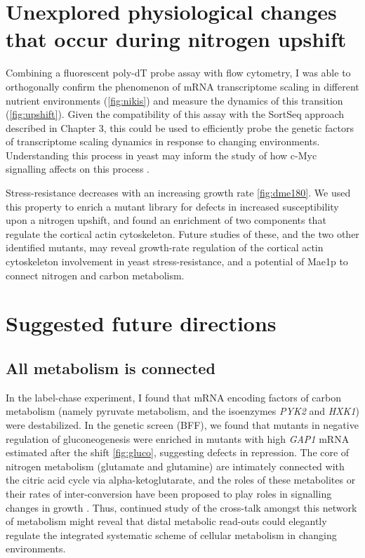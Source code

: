 \section{Unexplored physiological changes that occur during nitrogen
upshift}

Combining a fluorescent poly-dT probe assay
\parencite{amberg1992isolation} with flow cytometry, I was able to
orthogonally confirm the phenomenon of mRNA transcriptome scaling
in different nutrient environments (\autoref{fig:nikis}) and 
measure the dynamics of this transition (\autoref{fig:upshift}).
Given the compatibility of this assay with the SortSeq approach
described in Chapter 3, this could be used to efficiently probe the 
genetic factors of transcriptome scaling dynamics in response to
changing environments. Understanding this process in yeast may
inform the study of how c-Myc signalling affects on this process
\parencite{nie2012c}.

Stress-resistance decreases with an increasing growth rate
\autoref{fig:dme180}.
We used this property to enrich a mutant library for defects in
increased susceptibility upon a nitrogen upshift, and found an
enrichment of two components that regulate the cortical actin 
cytoskeleton. Future studies of these, and the two other identified
mutants, may reveal growth-rate regulation of the cortical actin 
cytoskeleton involvement in yeast stress-resistance, and a potential
of Mae1p to connect nitrogen and carbon metabolism.

\section{Suggested future directions}

\subsection{All metabolism is connected}

In the label-chase experiment, I found that mRNA encoding factors of
carbon metabolism (namely pyruvate metabolism, and the isoenzymes 
\textit{PYK2} and \textit{HXK1}) were destabilized.
In the genetic screen (BFF), we found that mutants in negative
regulation of gluconeogenesis were enriched in mutants with high
\textit{GAP1} mRNA estimated after the shift
\autoref{fig:gluco}, suggesting defects 
in repression. The core of nitrogen metabolism (glutamate and
glutamine) are intimately connected with the citric acid cycle via
alpha-ketoglutarate, and the roles of these metabolites or their
rates of inter-conversion have been proposed to play roles in
signalling changes in growth \parencite{fayyad2016yeast}.
Thus, continued study of the cross-talk amongst this network of
metabolism might reveal that distal metabolic read-outs could
elegantly regulate the integrated systematic scheme of cellular 
metabolism in changing environments.

